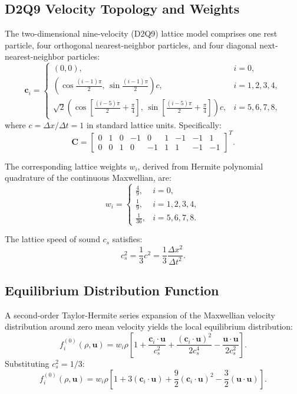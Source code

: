 \documentclass[11pt,a4paper]{article}
\begin{document}
\subsection{D2Q9 Velocity Topology and Weights}
The two-dimensional nine-velocity (D2Q9) lattice model comprises one rest particle, four orthogonal nearest-neighbor particles, and four diagonal next-nearest-neighbor particles:
\begin{equation}
\mathbf{c}_i = \begin{cases}
(0, 0), & i = 0, \\
\left(\cos \frac{(i-1)\pi}{2}, \, \sin \frac{(i-1)\pi}{2}\right) c, & i = 1, 2, 3, 4, \\
\sqrt{2}\left(\cos \left[\frac{(i-5)\pi}{2} + \frac{\pi}{4}\right], \, \sin \left[\frac{(i-5)\pi}{2} + \frac{\pi}{4}\right]\right) c, & i = 5, 6, 7, 8,
\end{cases}
\end{equation}
where $c = \Delta x / \Delta t = 1$ in standard lattice units. Specifically:
\begin{equation}
\mathbf{C} = \begin{bmatrix}
0 & 1 & 0 & -1 & 0 & 1 & -1 & -1 & 1 \\
0 & 0 & 1 & 0 & -1 & 1 & 1 & -1 & -1
\end{bmatrix}^T.
\end{equation}

The corresponding lattice weights $w_i$, derived from Hermite polynomial quadrature of the continuous Maxwellian, are:
\begin{equation}
w_i = \begin{cases}
\frac{4}{9}, & i = 0, \\[4pt]
\frac{1}{9}, & i = 1, 2, 3, 4, \\[4pt]
\frac{1}{36}, & i = 5, 6, 7, 8.
\end{cases}
\end{equation}

The lattice speed of sound $c_s$ satisfies:
\begin{equation}
c_s^2 = \frac{1}{3} c^2 = \frac{1}{3} \frac{\Delta x^2}{\Delta t^2}.
\end{equation}

\subsection{Equilibrium Distribution Function}
A second-order Taylor-Hermite series expansion of the Maxwellian velocity distribution around zero mean velocity yields the local equilibrium distribution:
\begin{equation}
f_i^{(0)}(\rho, \mathbf{u}) = w_i \rho \left[ 1 + \frac{\mathbf{c}_i \cdot \mathbf{u}}{c_s^2} + \frac{(\mathbf{c}_i \cdot \mathbf{u})^2}{2 c_s^4} - \frac{\mathbf{u} \cdot \mathbf{u}}{2 c_s^2} \right].
\end{equation}
Substituting $c_s^2 = 1/3$:
\begin{equation}
f_i^{(0)}(\rho, \mathbf{u}) = w_i \rho \left[ 1 + 3 (\mathbf{c}_i \cdot \mathbf{u}) + \frac{9}{2} (\mathbf{c}_i \cdot \mathbf{u})^2 - \frac{3}{2} (\mathbf{u} \cdot \mathbf{u}) \right].
\end{equation}
\end{document}
